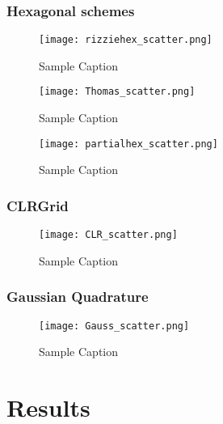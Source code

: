 \documentclass{article}
\begin{document}
\subsubsection{Hexagonal schemes}
\begin{figure}[ht]
    \centering
    \texttt{[image: rizziehex\_scatter.png]}
    \caption{Sample Caption}
\end{figure}


\begin{figure}[ht]
    \centering
    \texttt{[image: Thomas\_scatter.png]}
    \caption{Sample Caption}
\end{figure}


\begin{figure}[ht]
    \centering
    \texttt{[image: partialhex\_scatter.png]}
    \caption{Sample Caption}
\end{figure}


\subsubsection{CLRGrid}

\begin{figure}[ht]
    \centering
    \texttt{[image: CLR\_scatter.png]}
    \caption{Sample Caption}
\end{figure}


\subsubsection{Gaussian Quadrature}

\begin{figure}[ht]
    \centering
    \texttt{[image: Gauss\_scatter.png]}
    \caption{Sample Caption}
\end{figure}






\section{Results}

\end{document}
